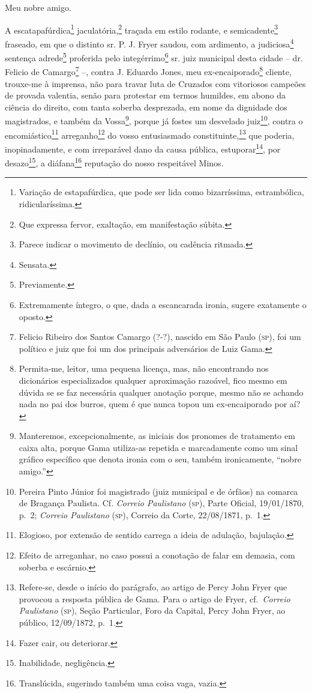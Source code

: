 Meu nobre amigo.

A escatapafúrdica\footnote{ Variação de estapafúrdica, que pode ser
  lida como bizarríssima, estrambólica, ridicularíssima.}
jaculatória,\footnote{ Que expressa fervor, exaltação, em manifestação
  súbita.} traçada em estilo rodante, e semicadente\footnote{ Parece
  indicar o movimento de declínio, ou cadência ritmada.} fraseado, em
que o distinto sr. P. J. Fryer saudou, com ardimento, a
judiciosa\footnote{ Sensata.} sentença adrede\footnote{ Previamente.}
proferida pelo integérrimo\footnote{ Extremamente íntegro, o que, dada
  a escancarada ironia, sugere exatamente o oposto.} sr. juiz municipal
desta cidade -- dr. Felicio de Camargo\footnote{ Felicio Ribeiro dos
  Santos Camargo (?-?), nascido em São Paulo (\textsc{sp}), foi um político e
  juiz que foi um dos principais adversários de Luiz Gama.} --, contra
J. Eduardo Jones, meu ex-encaiporado\footnote{ Permita-me, leitor, uma
  pequena licença, mas, não encontrando nos dicionários especializados
  qualquer aproximação razoável, fico mesmo em dúvida se se faz
  necessária qualquer anotação porque, mesmo não se achando nada no pai
  dos burros, quem é que nunca topou um ex-encaiporado por aí?} cliente,
trouxe-me à imprensa, não para travar luta de Cruzados com vitoriosos
campeões de provada valentia, senão para protestar em termos humildes,
em abono da ciência do direito, com tanta soberba desprezada, em nome da
dignidade dos magistrados, e também da Vossa\footnote{ Manteremos,
  excepcionalmente, as iniciais dos pronomes de tratamento em caixa
  alta, porque Gama utiliza-as repetida e marcadamente como um sinal
  gráfico específico que denota ironia com o seu, também ironicamente,
  ``nobre amigo.''}, porque já fostes um desvelado juiz\footnote{ Pereira
  Pinto Júnior foi magistrado (juiz municipal e de órfãos) na comarca de
  Bragança Paulista. Cf. \emph{Correio Paulistano} (\textsc{sp}), Parte Oficial,
  19/01/1870, p.~2; \emph{Correio Paulistano} (\textsc{sp}), Correio da Corte,
  22/08/1871, p.~1.}, contra o encomiástico\footnote{ Elogioso, por
  extensão de sentido carrega a ideia de adulação, bajulação.}
arreganho\footnote{ Efeito de arreganhar, no caso possui a conotação de
  falar em demasia, com soberba e escárnio.} do vosso entusiasmado
constituinte,\footnote{ Refere-se, desde o início do parágrafo, ao
  artigo de Percy John Fryer que provocou a resposta pública de Gama.
  Para o artigo de Fryer, cf.~\emph{Correio Paulistano} (\textsc{sp}), Seção
  Particular, Foro da Capital, Percy John Fryer, ao público, 12/09/1872,
  p.~1.} que poderia, inopinadamente, e com irreparável dano da causa
pública, estuporar\footnote{ Fazer cair, ou deteriorar.}, por
desazo\footnote{ Inabilidade, negligência.}, a diáfana\footnote{
  Translúcida, sugerindo também uma coisa vaga, vazia.} reputação do
nosso respeitável Minos.

